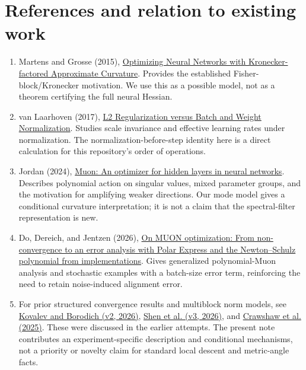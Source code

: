 \documentclass[11pt]{article}
\begin{document}
\section*{References and relation to existing work}
\begin{enumerate}
\item Martens and Grosse (2015),
\href{https://proceedings.mlr.press/v37/martens15.html}{Optimizing Neural
Networks with Kronecker-factored Approximate Curvature}.
Provides the established Fisher-block/Kronecker motivation. We use this
as a possible model, not as a theorem certifying the full neural Hessian.
\item van Laarhoven (2017),
\href{https://arxiv.org/abs/1706.05350}{L2 Regularization versus Batch and
Weight Normalization}. Studies scale invariance and effective learning
rates under normalization. The normalization-before-step identity here
is a direct calculation for this repository's order of operations.
\item Jordan (2024),
\href{https://kellerjordan.github.io/posts/muon/}{Muon: An optimizer for
hidden layers in neural networks}. Describes polynomial action on singular
values, mixed parameter groups, and the motivation for amplifying weaker
directions. Our mode model gives a conditional curvature interpretation;
it is not a claim that the spectral-filter representation is new.
\item Do, Dereich, and Jentzen (2026),
\href{https://arxiv.org/abs/2608.04607}{On MUON optimization: From
non-convergence to an error analysis with Polar Express and the
Newton--Schulz polynomial from implementations}. Gives generalized
polynomial-Muon analysis and stochastic examples with a batch-size error
term, reinforcing the need to retain noise-induced alignment error.
\item For prior structured convergence results and multiblock norm models,
see \href{https://arxiv.org/abs/2511.11466}{Kovalev and Borodich (v2, 2026)},
\href{https://arxiv.org/abs/2505.23737}{Shen et al. (v3, 2026)},
and \href{https://arxiv.org/abs/2510.09827}{Crawshaw et al. (2025)}.
These were discussed in the earlier attempts. The present note contributes
an experiment-specific description and conditional mechanisms, not a
priority or novelty claim for standard local descent and metric-angle facts.
\end{enumerate}
\end{document}
